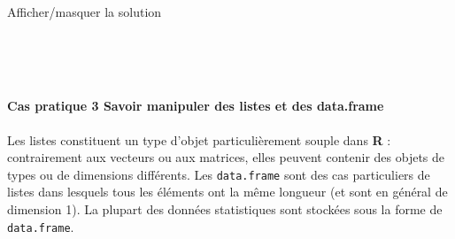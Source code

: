 \documentclass[12pt,]{article}
\newenvironment{Shaded}{}{}
\newcommand{\KeywordTok}[1]{\textcolor[rgb]{0.00,0.00,1.00}{{#1}}}
\newcommand{\DecValTok}[1]{{#1}}
\newcommand{\StringTok}[1]{\textcolor[rgb]{0.00,0.50,0.50}{{#1}}}
\newcommand{\CommentTok}[1]{\textcolor[rgb]{0.00,0.50,0.00}{{#1}}}
\newcommand{\NormalTok}[1]{{#1}}
\let\oldparagraph\paragraph
\renewcommand{\paragraph}[1]{\oldparagraph{#1}\mbox{}}
\begin{document}
\begin{enumerate}
  Afficher/masquer la solution

  \hypertarget{sol8}{}
\begin{Shaded}
\end{Shaded}

  ~
\end{enumerate}

~

\paragraph{\texorpdfstring{\textbf{Cas pratique 3} Savoir manipuler des
listes et des
data.frame}{Cas pratique 3 Savoir manipuler des listes et des data.frame}}\label{cas-pratique-3-savoir-manipuler-des-listes-et-des-data.frame}

Les listes constituent un type d'objet particulièrement souple dans
\textbf{R} : contrairement aux vecteurs ou aux matrices, elles peuvent
contenir des objets de types ou de dimensions différents. Les
\texttt{data.frame} sont des cas particuliers de listes dans lesquels
tous les éléments ont la même longueur (et sont en général de dimension
1). La plupart des données statistiques sont stockées sous la forme de
\texttt{data.frame}.
\end{document}
